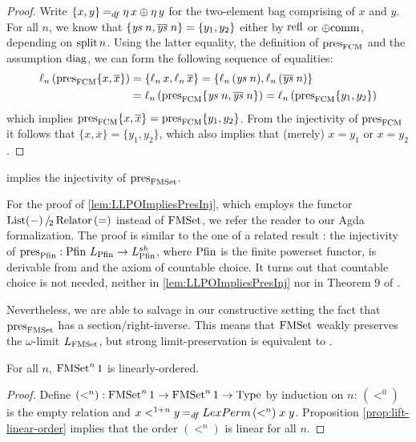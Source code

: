 \documentclass[a4paper,USenglish,cleveref]{lipics-v2021}
\begin{document}
\begin{proof}
  Write $\{x, y\} \DefEq \eta\, x \oplus \eta\, y$ for the two-element bag comprising of $x$ and $y$. For all $n$, we know that
    $\{\mathit{ys}\;n, \overline{\mathit{ys}}\;n\} = \{y_1, y_2\}$
  either by $\Op{refl}$ or $\Op{\oplus comm}$, depending on $\Op{split} n$.
  Using the latter equality, the definition of $\pres{\FCM}$ and the assumption $\Op{diag}$, we can form the following sequence of equalities:%
  \begin{align*}
    \ell_n\,(\pres{\FCM} \{x, \overline{x}\})
      &= \{\ell_n \,x , \ell_n \,\overline{x}\}
      = \{\ell_n \,(\Var{ys}\;n) , \ell_n\,(\overline{\Var{ys}} \;n)\}\\
      &= \ell_n \, (\pres{\FCM} \{\Var{ys}\;n , \overline{\Var{ys}}\;n\})
      = \ell_n \, (\pres{\FCM} \{y_1 , y_2\})
  \end{align*}
  which implies $\pres{\FCM}\{x, \overline{x}\} = \pres{\FCM}\{y_1, y_2\}$.
  From the injectivity of $\pres{\FCM}$ it follows that $\{x, \overline{x}\} = \{y_1, y_2\}$, which also implies that (merely) $x = y_1$ or $x = y_2$.
\end{proof}

\begin{theorem}\label{lem:LLPOImpliesPresInj}
  \LLPO{} implies the injectivity of $\pres{\FMSet}$.
\end{theorem}
For the proof of \cref{lem:LLPOImpliesPresInj}, which employs the functor $\SetQuot[\List (-)][\Relator\,(=)]$ instead of $\FMSet$, we refer the reader to our Agda formalization.  The proof is similar to the one of a related result \cite[Theorem 9]{Veltri2021}: the injectivity of $\pres{\Op{Pfin}} : \Op{Pfin} \,\Lim{\Op{Pfin}} \to \LimSh{\Op{Pfin}}$, where $\Op{Pfin}$ is the finite powerset functor, is derivable from \LLPO{} and the axiom of countable choice. It turns out that countable choice is not needed, neither in \cref{lem:LLPOImpliesPresInj} nor in Theorem 9 of \cite{Veltri2021}.

Nevertheless, we are able to salvage in our constructive setting the fact that $\pres{\FMSet}$ has a section/right-inverse. This means that $\FMSet$ weakly preserves the $\omega$-limit $\Lim{\FMSet}$, but strong limit-preservation is equivalent to \LLPO{}.
\begin{lemma}\label{lem:iter-linear}
For all $n$, $\FMSet^n 1$ is linearly-ordered.
\end{lemma}
\begin{proof}
Define $(<^n) : \FMSet^n 1 \to \FMSet^n 1 \to \Type$ by induction on $n$: $(<^0)$ is the empty relation and $x <^{1 + n} y \DefEq \LexPerm\,(<^n)\;x\;y$. Proposition \ref{prop:lift-linear-order} implies that the order $(<^n)$ is linear for all $n$.
\end{proof}
\end{document}
